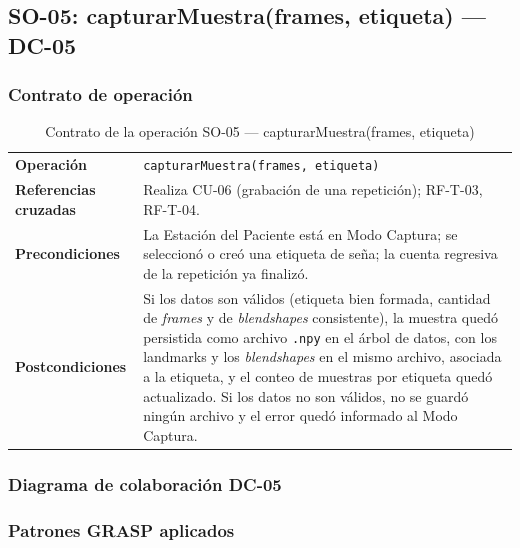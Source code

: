 \subsection{SO-05: capturarMuestra(frames, etiqueta) --- DC-05}

\subsubsection{Contrato de operación}

\begin{table}[H]
\centering
\begin{tabularx}{\textwidth}{@{}p{4.4cm} X@{}}
\toprule
\textbf{Operación} & \texttt{capturarMuestra(frames, etiqueta)} \\
\textbf{Referencias cruzadas} & Realiza CU-06 (grabación de una repetición);
RF-T-03, RF-T-04. \\
\textbf{Precondiciones} & La Estación del Paciente está en Modo Captura; se
seleccionó o creó una etiqueta de seña; la cuenta regresiva de la repetición
ya finalizó. \\
\textbf{Postcondiciones} & Si los datos son válidos (etiqueta bien formada,
cantidad de \textit{frames} y de \textit{blendshapes} consistente), la
muestra quedó persistida como archivo \texttt{.npy} en el árbol de datos,
con los landmarks y los \textit{blendshapes} en el mismo archivo, asociada a
la etiqueta, y el conteo de muestras por etiqueta quedó actualizado. Si los
datos no son válidos, no se guardó ningún archivo y el error quedó
informado al Modo Captura. \\
\bottomrule
\end{tabularx}
\caption{Contrato de la operación SO-05 --- capturarMuestra(frames, etiqueta)}
\label{tab:col-contrato-so05}
\end{table}

\subsubsection{Diagrama de colaboración DC-05}


\subsubsection{Patrones GRASP aplicados}

